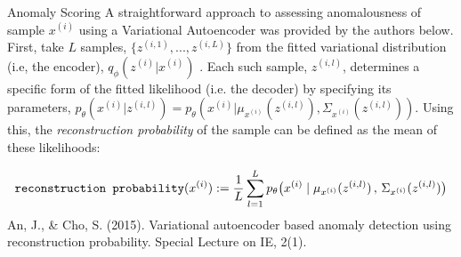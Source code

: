\documentclass[10pt]{beamer}
\newcommand{\obs}{x^{(i)} }
\newcommand{\alatent}{z^{(i)} }
\begin{document}
\begin{frame}{Anomaly Scoring}
A straightforward approach to assessing anomalousness of sample $x^{(i)}$ using a Variational Autoencoder was provided by the authors below.   First, take $L$ samples, $\{z^{(i,1)}, ..., z^{(i,L)} \}$ from the fitted variational distribution (i.e, the encoder), $q_\phi(\alatent| x^{(i)})$ .   Each such sample, $z^{(i,l)}$, determines a specific form of the fitted likelihood (i.e. the decoder) by specifying its parameters, $p_\theta(\obs | z^{(i,l)}) = p_\theta(\obs | \mu_{\obs} (z^{(i,l)}), \Sigma_{\obs} (z^{(i,l)})) $. Using this, the \textit{reconstruction probability} of the sample can be defined as the mean of these likelihoods:

\[ \texttt{reconstruction probability}(x^{(i)}) := \df{1}{L} \ds\sum_{l=1}^L p_\theta \big(\obs \cond \mu_{\obs} (z^{(i,l)}) \, , \, \Sigma_{\obs} (z^{(i,l)}) \big)\]
\vfill \vfill
\hfill \tiny An, J., \& Cho, S. (2015). Variational autoencoder based anomaly detection using reconstruction probability. Special Lecture on IE, 2(1).
\end{frame}
\end{document}
